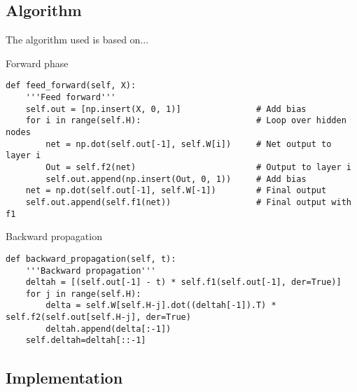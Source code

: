 \subsection{Algorithm}
The algorithm used is based on...

Forward phase
\lstset{basicstyle=\scriptsize}
\begin{lstlisting}
def feed_forward(self, X):
	'''Feed forward'''
	self.out = [np.insert(X, 0, 1)]               # Add bias
	for i in range(self.H):                       # Loop over hidden nodes
		net = np.dot(self.out[-1], self.W[i])     # Net output to layer i
		Out = self.f2(net)                        # Output to layer i
		self.out.append(np.insert(Out, 0, 1))     # Add bias
	net = np.dot(self.out[-1], self.W[-1])        # Final output
	self.out.append(self.f1(net))                 # Final output with f1
\end{lstlisting}

Backward propagation
\begin{lstlisting}
def backward_propagation(self, t):
	'''Backward propagation'''
	deltah = [(self.out[-1] - t) * self.f1(self.out[-1], der=True)]
	for j in range(self.H):
		delta = self.W[self.H-j].dot((deltah[-1]).T) * self.f2(self.out[self.H-j], der=True)
		deltah.append(delta[:-1])
	self.deltah=deltah[::-1]
\end{lstlisting}

\subsection{Implementation}